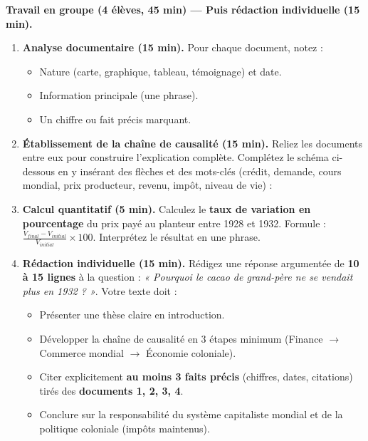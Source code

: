 \documentclass[11pt]{article}
\newcounter{popsec}
\newcounter{popsub}
\newcommand{\courssub}[1]{%
  \stepcounter{popsub}%
  \par\vspace{9pt}\noindent{\popxbold\fontsize{11.5}{13}\selectfont\color{popink}{\color{poporange}\thepopsec.\thepopsub}\hspace{6pt}#1}\par\nopagebreak\vspace{4pt}
}
\begin{document}
\courssub{Consignes}
\textbf{Travail en groupe (4 élèves, 45 min) — Puis rédaction individuelle (15 min).}

\begin{enumerate}
    \item \textbf{Analyse documentaire (15 min).} Pour chaque document, notez : 
    \begin{itemize}
        \item Nature (carte, graphique, tableau, témoignage) et date.
        \item Information principale (une phrase).
        \item Un chiffre ou fait précis marquant.
    \end{itemize}
    \item \textbf{Établissement de la chaîne de causalité (15 min).} Reliez les documents entre eux pour construire l'explication complète. Complétez le schéma ci-dessous en y insérant des flèches et des mots-clés (crédit, demande, cours mondial, prix producteur, revenu, impôt, niveau de vie) :
    \begin{center}
    \end{center}
    \item \textbf{Calcul quantitatif (5 min).} Calculez le \textbf{taux de variation en pourcentage} du prix payé au planteur entre 1928 et 1932. Formule : $\frac{V_{final} - V_{initial}}{V_{initial}} \times 100$. Interprétez le résultat en une phrase.
    \item \textbf{Rédaction individuelle (15 min).} Rédigez une réponse argumentée de \textbf{10 à 15 lignes} à la question : \emph{« Pourquoi le cacao de grand-père ne se vendait plus en 1932 ? »}. Votre texte doit :
    \begin{itemize}
        \item Présenter une thèse claire en introduction.
        \item Développer la chaîne de causalité en 3 étapes minimum (Finance $\rightarrow$ Commerce mondial $\rightarrow$ Économie coloniale).
        \item Citer explicitement \textbf{au moins 3 faits précis} (chiffres, dates, citations) tirés des \textbf{documents 1, 2, 3, 4}.
        \item Conclure sur la responsabilité du système capitaliste mondial et de la politique coloniale (impôts maintenus).
    \end{itemize}
\end{enumerate}
\end{document}
